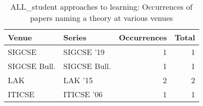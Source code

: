 \begin{table*}[t]
\begin{tabular}{llrr}
Venue & Series & Occurrences & Total\\\hline
\multirow{1}{*}{SIGCSE } & SIGCSE '19 & 1 & \multirow{1}{*}{1}\\
\multirow{1}{*}{SIGCSE Bull.} & SIGCSE Bull. & 1 & \multirow{1}{*}{1}\\
\multirow{1}{*}{LAK } & LAK '15 & 2 & \multirow{1}{*}{2}\\
\multirow{1}{*}{ITICSE } & ITICSE '06 & 1 & \multirow{1}{*}{1}\\
\end{tabular}
\caption{ALL\_student approaches to learning: Occurrences of papers naming a theory at various venues}
\end{table*}